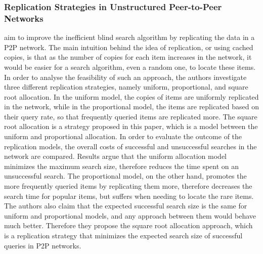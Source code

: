 \subsubsection{Replication Strategies in Unstructured Peer-to-Peer Networks}
\cite{Cohen02} aim to improve the inefficient blind search algorithm by
replicating the data in a P2P network. The main intuition behind the
idea of replication, or using cached copies, is that as the number of copies for
each item increases in the network, it would be easier for a search algorithm,
even a random one, to locate these items. In order to analyse the feasibility of
such an approach, the authors investigate three different replication
strategies, namely uniform, proportional, and square root allocation. In the
uniform model, the copies of items are uniformly replicated in the network,
while in the proportional model, the items are replicated based on their query
rate, so that frequently queried items are replicated more. The square root
allocation is a strategy proposed in this paper, which is a model between the
uniform and proportional allocation.  In order to evaluate the outcome of the
replication models, the overall costs of successful and unsuccessful searches in
the network are compared. Results argue that the uniform allocation model
minimizes the maximum search size, therefore reduces the time spent on an
unsuccessful search. The proportional model, on the other hand, promotes the
more frequently queried items by replicating them more, therefore decreases the
search time for popular items, but suffers when needing to locate the rare
items. The authors also claim that the expected successful search size is the
same for uniform and proportional models, and any approach between them would
behave much better. Therefore they propose the square root allocation approach,
which is a replication strategy that minimizes the expected search size of
successful queries in P2P networks.

